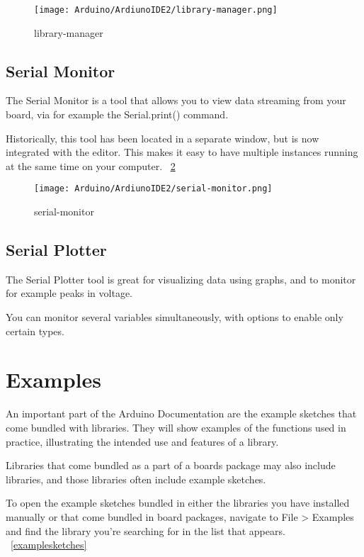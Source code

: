 \begin{figure}
    \begin{center}
        \texttt{[image: Arduino/ArdiunoIDE2/library-manager.png]}
        \caption{library-manager}
        \label{library-manager}
    \end{center}
\end{figure}

\subsection{Serial Monitor}
The Serial Monitor is a tool that allows you to view data streaming from your board, via for example the Serial.print() command.

Historically, this tool has been located in a separate window, but is now integrated with the editor. This makes it easy to have multiple instances running at the same time on your computer. ~\ref{serial-monitor}

\begin{figure}
    \begin{center}
        \texttt{[image: Arduino/ArdiunoIDE2/serial-monitor.png]}
        \caption{serial-monitor}
        \label{serial-monitor}
    \end{center}
\end{figure}

\subsection{Serial Plotter}
The Serial Plotter tool is great for visualizing data using graphs, and to monitor for example peaks in voltage.

You can monitor several variables simultaneously, with options to enable only certain types. 

\section{Examples}
An important part of the Arduino Documentation are the example sketches that come bundled with libraries. They will show examples of the functions used in practice, illustrating the intended use and features of a library.

Libraries that come bundled as a part of a boards package may also include libraries, and those libraries often include example sketches.

To open the example sketches bundled in either the libraries you have installed manually or that come bundled in board packages, navigate to File > Examples and find the library you're searching for in the list that appears. ~\ref{examplesketches}

